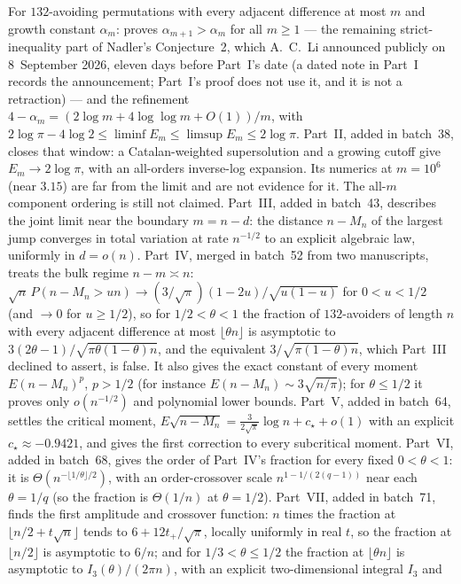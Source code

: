 \documentclass[11pt]{article}
\begin{document}
{For $132$-avoiding permutations with every adjacent difference at most $m$ and
growth constant $\alpha_m$: proves $\alpha_{m+1}>\alpha_m$ for all $m\ge1$ ---
the remaining strict-inequality part of Nadler's Conjecture~2, which A.~C.~Li
announced publicly on 8~September 2026, eleven days before Part~I's date (a
dated note in Part~I records the announcement; Part~I's proof does not use
it, and it is not a retraction) --- and the
refinement $4-\alpha_m=(2\log m+4\log\log m+O(1))/m$, with
$2\log\pi-4\log2\le\liminf E_m\le\limsup E_m\le2\log\pi$.  Part~II, added in
batch~38, closes that window: a Catalan-weighted supersolution and a growing
cutoff give $E_m\to2\log\pi$, with an all-orders inverse-log expansion.  Its
numerics at $m=10^6$ (near $3.15$) are far from the limit and are not evidence
for it.  The all-$m$ component ordering is still not claimed.  Part~III, added
in batch~43, describes the joint limit near the boundary $m=n-d$: the
distance $n-M_n$ of the largest jump converges in total variation at rate
$n^{-1/2}$ to an explicit algebraic law, uniformly in $d=o(n)$.  Part~IV,
merged in batch~52 from two manuscripts, treats the bulk regime $n-m\asymp n$:
$\sqrt n\,P(n-M_n>un)\to(3/\sqrt\pi)(1-2u)/\sqrt{u(1-u)}$ for $0<u<1/2$ (and
$\to0$ for $u\ge1/2$), so for $1/2<\theta<1$ the fraction of $132$-avoiders of
length $n$ with every adjacent difference at most $\lfloor\theta n\rfloor$ is
asymptotic to $3(2\theta-1)/\sqrt{\pi\theta(1-\theta)n}$, and the equivalent
$3/\sqrt{\pi(1-\theta)n}$, which Part~III declined to assert, is false.  It
also gives the exact constant of every moment $E(n-M_n)^p$, $p>1/2$ (for
instance $E(n-M_n)\sim3\sqrt{n/\pi}$); for $\theta\le1/2$ it proves only
$o(n^{-1/2})$ and polynomial lower bounds.  Part~V, added in batch~64, settles
the critical moment, $E\sqrt{n-M_n}=\frac{3}{2\sqrt\pi}\log n+c_\star+o(1)$
with an explicit $c_\star\approx-0.9421$, and gives the first correction to
every subcritical moment.  Part~VI, added in batch~68, gives the order of
Part~IV's fraction for every fixed $0<\theta<1$: it is
$\Theta(n^{-\lfloor1/\theta\rfloor/2})$, with an order-crossover scale
$n^{1-1/(2(q-1))}$ near each $\theta=1/q$ (so the fraction is $\Theta(1/n)$
at $\theta=1/2$).  Part~VII, added in batch~71, finds the first amplitude and
crossover function: $n$ times the fraction at $\lfloor n/2+t\sqrt n\rfloor$
tends to $6+12t_+/\sqrt\pi$, locally uniformly in real $t$, so the fraction
at $\lfloor n/2\rfloor$ is asymptotic to $6/n$; and for $1/3<\theta\le1/2$
the fraction at $\lfloor\theta n\rfloor$ is asymptotic to
$I_3(\theta)/(2\pi n)$, with an explicit two-dimensional integral $I_3$ and
}
\end{document}
